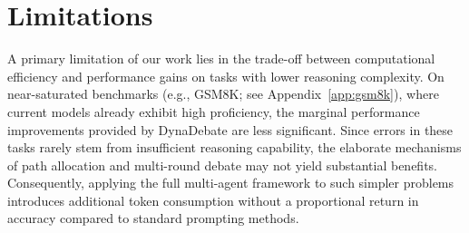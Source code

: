 \section{Limitations}
A primary limitation of our work lies in the trade-off between computational efficiency and performance gains on tasks with lower reasoning complexity. On near-saturated benchmarks (e.g., GSM8K; see Appendix~\ref{app:gsm8k}), where current models already exhibit high proficiency, the marginal performance improvements provided by DynaDebate are less significant. Since errors in these tasks rarely stem from insufficient reasoning capability, the elaborate mechanisms of path allocation and multi-round debate may not yield substantial benefits. Consequently, applying the full multi-agent framework to such simpler problems introduces additional token consumption without a proportional return in accuracy compared to standard prompting methods.
